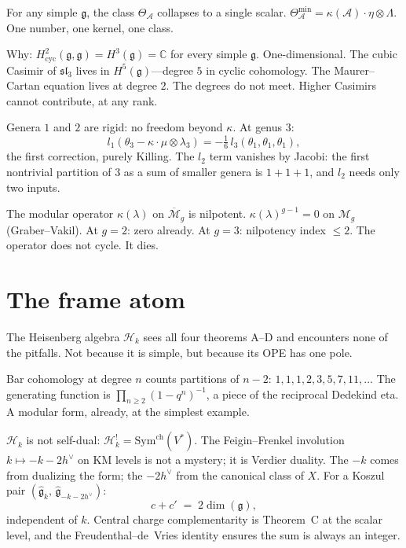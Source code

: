 \documentclass[11pt]{article}
\newcommand{\cA}{\mathcal{A}}
\newcommand{\cM}{\mathcal{M}}
\newcommand{\cH}{\mathcal{H}}
\newcommand{\fg}{\mathfrak{g}}
\newcommand{\fsl}{\mathfrak{sl}}
\newcommand{\C}{\mathbb{C}}
\begin{document}
For any simple $\fg$, the class $\Theta_\cA$ collapses to a
single scalar.  $\Theta^{\min}_\cA = \kappa(\cA) \cdot \eta
\otimes \Lambda$.  One number, one kernel, one class.

Why: $H^2_{\mathrm{cyc}}(\fg,\fg) = H^3(\fg) = \C$ for every
simple $\fg$.  One-dimensional.  The cubic Casimir of $\fsl_3$
lives in $H^5(\fg)$---degree $5$ in cyclic cohomology.  The
Maurer--Cartan equation lives at degree $2$.  The degrees do not meet.  Higher Casimirs cannot contribute,
at any rank.

Genera $1$ and $2$ are rigid: no freedom beyond $\kappa$.  At
genus $3$:
\[
l_1(\theta_3 - \kappa \cdot \mu \otimes \lambda_3)
= -\tfrac{1}{6}\, l_3(\theta_1, \theta_1, \theta_1),
\]
the first correction, purely Killing.  The $l_2$ term vanishes
by Jacobi: the first nontrivial partition of $3$ as a sum of
smaller genera is $1 + 1 + 1$, and $l_2$ needs only two inputs.

The modular operator $\kappa(\lambda)$ on $\overline{\cM}_g$ is
nilpotent.  $\kappa(\lambda)^{g-1} = 0$ on $\cM_g$ (Graber--Vakil).
At $g = 2$: zero already.  At $g = 3$: nilpotency index $\leq 2$.
The operator does not cycle.  It dies.


\section{The frame atom}
\label{sec:frame}

The Heisenberg algebra $\cH_k$ sees all four theorems A--D and
encounters none of the pitfalls.  Not because it is simple, but
because its OPE has one pole.

Bar cohomology at degree $n$ counts partitions of $n-2$:
$1, 1, 1, 2, 3, 5, 7, 11, \ldots$
The generating function is $\prod_{n \geq 2}(1-q^n)^{-1}$, a
piece of the reciprocal Dedekind eta.  A modular form, already,
at the simplest example.

$\cH_k$ is not self-dual: $\cH_k^! = \mathrm{Sym}^{\mathrm{ch}}(V^*)$.
The Feigin--Frenkel involution $k \mapsto -k - 2h^\vee$ on KM
levels is not a mystery; it is Verdier duality.  The $-k$ comes from
dualizing the form; the $-2h^\vee$ from the canonical class of $X$.
For a Koszul pair $(\widehat{\fg}_k,\,\widehat{\fg}_{-k-2h^\vee})$:
\[
c + c' \;=\; 2\dim(\fg),
\]
independent of $k$.  Central charge complementarity is Theorem~C
at the scalar level, and the Freudenthal--de~Vries identity ensures
the sum is always an integer.
\end{document}
